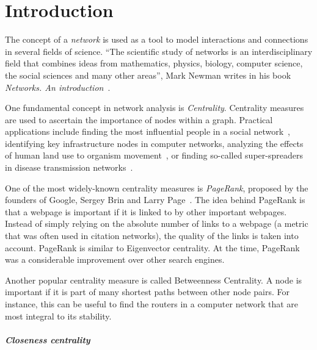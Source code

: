 
\chapter{Introduction}
\label{ch:Introduction}

The concept of a \emph{network} is used as a tool to model interactions and connections in several fields of science. ``The scientific study of networks \textelp{} is an interdisciplinary field that combines ideas from mathematics, physics, biology, computer science, the social sciences and many other areas'', Mark Newman writes in his book \emph{Networks. An introduction}~\cite{newmannetworks}.   

One fundamental concept in network analysis is \emph{Centrality}. Centrality measures are used to ascertain the importance of nodes within a graph. Practical applications include finding the most influential people in a social network~\cite{FREEMAN1978215}, identifying key infrastructure nodes in computer networks, analyzing the effects of human land use to organism movement~\cite{estrada2008using}, or finding so-called super-spreaders in disease transmission networks~\cite{dekker2013network}. 

One of the most widely-known centrality measures is \emph{PageRank}, proposed by the founders of Google, Sergey Brin and Larry Page~\cite{page1999pagerank}. The idea behind PageRank is that a webpage is important if it is linked to by other important webpages. Instead of simply relying on the absolute number of links to a webpage (a metric that was often used in citation networks), the quality of the links is taken into account. PageRank is similar to Eigenvector centrality. At the time, PageRank was a considerable improvement over other search engines.

Another popular centrality measure is called Betweenness Centrality. A node is important if it is part of many shortest paths between other node pairs. For instance, this can be useful to find the routers in a computer network that are most integral to its stability.
\paragraph{Closeness centrality}

